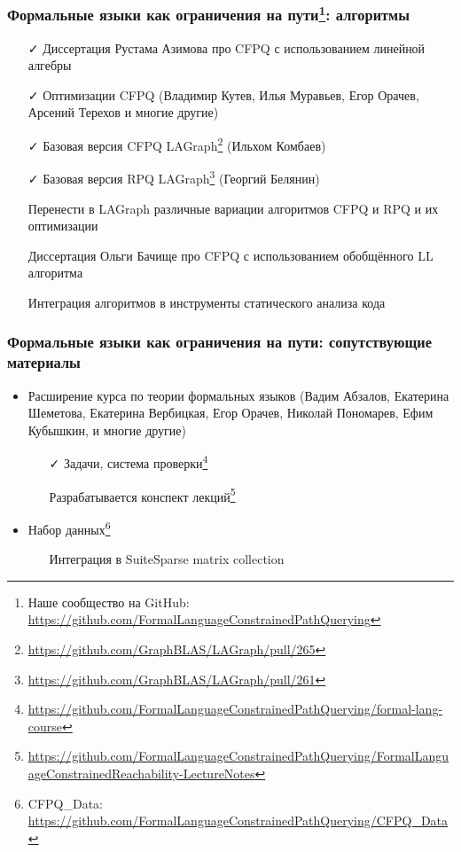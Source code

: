 \documentclass[xcolor=table,aspectratio=169]{beamer}
\begin{document}
\begin{frame}[fragile]
  \frametitle{Формальные языки как ограничения на пути\footnote{Наше сообщество на GitHub: \url{https://github.com/FormalLanguageConstrainedPathQuerying}}: алгоритмы}
  \begin{itemize}
      \item[\faCheck] Диссертация Рустама Азимова про CFPQ с использованием линейной алгебры
      \item[\faCheck] Оптимизации CFPQ (Владимир Кутев, Илья Муравьев, Егор Орачев, Арсений Терехов и многие другие)
      \item[\faCheck] Базовая версия CFPQ LAGraph\footnote{\url{https://github.com/GraphBLAS/LAGraph/pull/265}} (Ильхом Комбаев)
      \item[\faCheck] Базовая версия RPQ LAGraph\footnote{\url{https://github.com/GraphBLAS/LAGraph/pull/261}} (Георгий Белянин)
      \item[\faGears] Перенести в LAGraph различные вариации алгоритмов CFPQ и RPQ и их оптимизации
      \item[\faGears] Диссертация Ольги Бачище про CFPQ с использованием обобщённого LL алгоритма
      \item[\faGears] Интеграция алгоритмов в инструменты статического анализа кода
  \end{itemize}
\end{frame}

\begin{frame}[fragile]
  \frametitle{Формальные языки как ограничения на пути: сопутствующие материалы}
  \begin{itemize}    
    \item Расширение курса по теории формальных языков (Вадим Абзалов, Екатерина Шеметова, Екатерина Вербицкая, Егор Орачев, Николай Пономарев, Ефим Кубышкин, и многие другие)
      \begin{itemize}
        \item[\faCheck] Задачи, система проверки\footnote{\url{https://github.com/FormalLanguageConstrainedPathQuerying/formal-lang-course}}
        \item[\faGears] Разрабатывается конспект лекций\footnote{\url{https://github.com/FormalLanguageConstrainedPathQuerying/FormalLanguageConstrainedReachability-LectureNotes}}
      \end{itemize}
    \item Набор данных\footnote{CFPQ\_Data: \url{https://github.com/FormalLanguageConstrainedPathQuerying/CFPQ_Data}}
    \begin{itemize}
      \item[\faGears] Интеграция в SuiteSparse matrix  collection
    \end{itemize}
  \end{itemize}
\end{frame}
\end{document}
